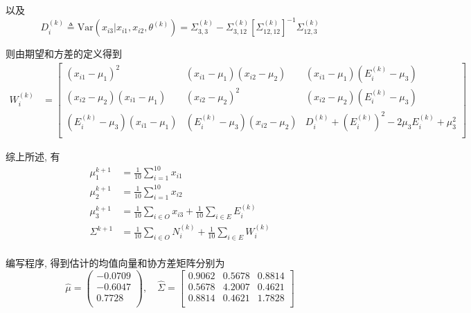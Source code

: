 \documentclass[openany]{ctexbook}
\theoremstyle{kaiti}
\theoremstyle{normal}
\begin{document}
以及
\begin{equation}
  D_i^{(k)}\triangleq\mathrm{Var}(x_{i3}|x_{i1},x_{i2},\theta^{(k)})=\Sigma_{3,3}^{(k)}-\Sigma_{3,12}^{(k)}\left[\Sigma_{12,12}^{(k)}\right]^{-1}\Sigma_{12,3}^{(k)}
\end{equation}

则由期望和方差的定义得到
\begin{equation}
  \begin{aligned}
    W_i^{(k)}
    &=
    \begin{bmatrix}
      (x_{i1}-\mu_1)^2 & (x_{i1}-\mu_1)(x_{i2}-\mu_2) & (x_{i1}-\mu_1)\left(E_i^{(k)}-\mu_3\right)\\[2mm]
      (x_{i2}-\mu_2)(x_{i1}-\mu_1) & (x_{i2}-\mu_2)^2 & (x_{i2}-\mu_2)\left(E_i^{(k)}-\mu_3\right)\\
      \left(E_i^{(k)}-\mu_3\right)(x_{i1}-\mu_1) & \left(E_i^{(k)}-\mu_3\right)(x_{i2}-\mu_2) & D_i^{(k)}+\left(E_i^{(k)}\right)^2-2\mu_3E_i^{(k)}+\mu_3^2\\
    \end{bmatrix}
  \end{aligned}
\end{equation}

综上所述, 有
\begin{equation}
  \begin{aligned}
    \mu_1^{k+1}&=\frac{1}{10}\sum_{i=1}^{10}x_{i1}\\
    \mu_2^{k+1}&=\frac{1}{10}\sum_{i=1}^{10}x_{i2}\\
    \mu_3^{k+1}&=\frac{1}{10}\sum_{i\in O}x_{i3}+\frac{1}{10}\sum_{i\in E}E_i^{(k)}\\
    \Sigma^{k+1}&=\frac{1}{10}\sum_{i\in O}N_i^{(k)}+\frac{1}{10}\sum_{i\in E}W_i^{(k)}\\
  \end{aligned}
\end{equation}

编写程序, 得到估计的均值向量和协方差矩阵分别为
\begin{equation}
  \hat{\mu}=
  \begin{pmatrix}
    -0.0709\\
    -0.6047\\
    0.7728\\
  \end{pmatrix},
  \quad
  \hat{\Sigma}=
  \begin{bmatrix}
    0.9062 & 0.5678 & 0.8814 \\
    0.5678 & 4.2007 & 0.4621 \\
    0.8814 & 0.4621 & 1.7828 \\
  \end{bmatrix}
\end{equation}
\end{document}
